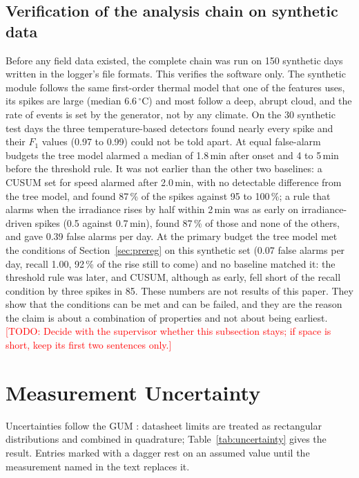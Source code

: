 \documentclass[conference]{IEEEtran}
\newcommand{\degC}{\ensuremath{^\circ}C}
\newcommand{\todo}[1]{\textcolor{red}{[TODO: #1]}}
\begin{document}
\subsection{Verification of the analysis chain on synthetic data}\label{sec:synthetic}
Before any field data existed, the complete chain was run on 150 synthetic days written
in the logger's file formats. This verifies the software only. The synthetic module
follows the same first-order thermal model that one of the features uses, its spikes are
large (median 6.6\,\degC) and most follow a deep, abrupt cloud, and the rate of events
is set by the generator, not by any climate. On the 30 synthetic test days the three
temperature-based detectors found nearly every spike and their $F_1$ values (0.97 to
0.99) could not be told apart. At equal false-alarm budgets the tree model alarmed a
median of 1.8\,min after onset and 4 to 5\,min before the threshold rule. It was not
earlier than the other two baselines: a CUSUM set for speed alarmed after 2.0\,min, with
no detectable difference from the tree model, and found 87\,\% of the spikes against 95
to 100\,\%; a rule that alarms when the irradiance rises by half within 2\,min was as
early on irradiance-driven spikes (0.5 against 0.7\,min), found 87\,\% of those and none
of the others, and gave 0.39 false alarms per day. At the primary budget the tree model
met the conditions of Section~\ref{sec:prereg} on this synthetic set (0.07 false alarms
per day, recall 1.00, 92\,\% of the rise still to come) and no baseline matched it: the
threshold rule was later, and CUSUM, although as early, fell short of the recall
condition by three spikes in 85. These numbers are not results of this paper. They
show that the conditions can be met and can be failed, and they are the reason the claim
is about a combination of properties and not about being earliest.
\todo{Decide with the supervisor whether this subsection stays; if space is short, keep
its first two sentences only.}

\section{Measurement Uncertainty}\label{sec:uncertainty}
Uncertainties follow the GUM \cite{gum2008}: datasheet limits are treated as rectangular
distributions and combined in quadrature; Table~\ref{tab:uncertainty} gives the result.
Entries marked with a dagger rest on an assumed value until the measurement named in the
text replaces it.
\end{document}
